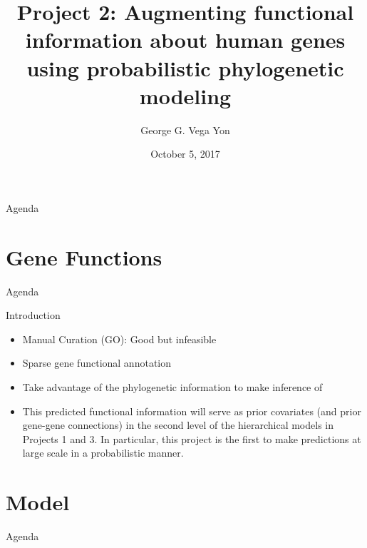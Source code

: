 \documentclass[9pt,ignorenonframetext,]{beamer}
\title{Project 2: Augmenting functional information about human genes using
probabilistic phylogenetic modeling}
\author[
Vega Yon
]{George G. Vega Yon}
\institute[USC]{Department of Preventive Medicine \and University of Southern California}
\date{October 5, 2017}
\providecommand{\tightlist}{%
  \setlength{\itemsep}{0pt}\setlength{\parskip}{0pt}}
\begin{document}

\begin{frame}{Agenda}

\tableofcontents{}

\end{frame}

\section{Gene Functions}\label{gene-functions}

\begin{frame}{Agenda}

\tableofcontents[currentsection]

\end{frame}

\begin{frame}{Introduction}

\begin{itemize}
\tightlist
\item
  Manual Curation (GO): Good but infeasible \pause
\item
  Sparse gene functional annotation \pause
\item
  Take advantage of the phylogenetic information to make inference of
  \pause
\item
  This predicted functional information will serve as prior covariates
  (and prior gene-gene connections) in the second level of the
  hierarchical models in Projects 1 and 3. In particular, this project
  is the first to make predictions at large scale in a probabilistic
  manner.
\end{itemize}

\end{frame}

\section{Model}\label{model}

\begin{frame}{Agenda}

\tableofcontents[currentsection]

\end{frame}
\end{document}
